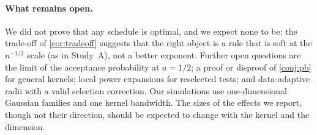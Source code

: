 \paragraph{What remains open.} We did not prove that any schedule is optimal, and we expect none to be: the trade-off of \cref{cor:tradeoff} suggests that the right object is a rule that is soft at the $n^{-1/2}$ scale (as in Study~A), not a better exponent. Further open questions are the limit of the acceptance probability at $a=1/2$; a proof or disproof of \cref{conj:pb} for general kernels; local power expansions for reselected tests; and data-adaptive radii with a valid selection correction. Our simulations use one-dimensional Gaussian families and one kernel bandwidth. The sizes of the effects we report, though not their direction, should be expected to change with the kernel and the dimension.
